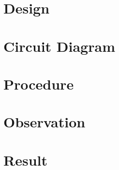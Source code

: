 \documentclass{book}
\begin{document}
\section*{Design}
\section*{Circuit Diagram}
\section*{Procedure}
\section*{Observation}
\section*{Result}
\end{document}
